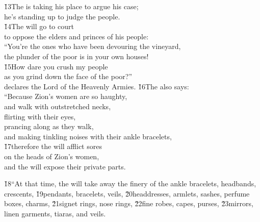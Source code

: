 \begin{poetry}
\poeml \v{13}The  is taking his place to argue his case; \\
\poemll    he's standing up to judge the people. \\
\poeml \v{14}The  will go to court \\
\poemll    to oppose the elders and princes of his people: \\
\poeml ``You're the ones who have been devouring the vineyard, \\
\poemll    the plunder of the poor is in your own houses! \\
\poeml \v{15}How dare you crush my people \\
\poemll    as you grind down the face of the poor?'' \\
\poemlll       declares the Lord  of the Heavenly Armies.
\poeml \v{16}The  also says: \\
\poeml ``Because Zion's women are so haughty, \\
\poemll    and walk with outstretched necks, \\
\poeml flirting with their eyes, \\
\poemll    prancing along as they walk, \\
\poemlll       and making tinkling noises with their ankle bracelets, \\
\poeml \v{17}therefore the  will afflict sores \\
\poemll    on the heads of Zion's women, \\
\poemlll       and the  will expose their private parts.
\end{poetry}

\v{18}``At that time, the  will take away the finery of the ankle bracelets, headbands, crescents, \v{19}pendants, bracelets, veils, \v{20}headdresses, armlets, sashes, perfume boxes, charms, \v{21}signet rings, nose rings, \v{22}fine robes, capes, purses, \v{23}mirrors, linen garments, tiaras, and veils.

